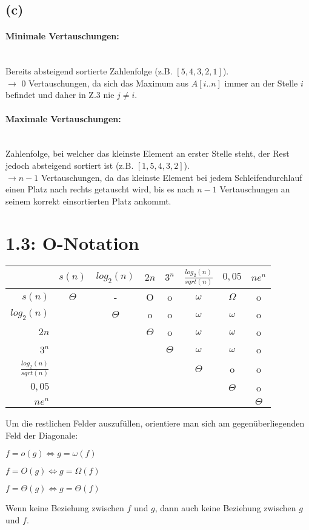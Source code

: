 \documentclass[a4paper,12pt]{article}
\begin{document}
\subsection{(c)}
\paragraph{Minimale Vertauschungen:}\mbox{}\\
\indent Bereits absteigend sortierte Zahlenfolge (z.B. $[5,4,3,2,1]$). \\
$\rightarrow$ 0 Vertauschungen, da sich das Maximum aus $A[i..n]$ immer an der Stelle $i$ befindet und daher in Z.3 nie $j \neq i$.

\paragraph{Maximale Vertauschungen:}\mbox{}\\
\indent Zahlenfolge, bei welcher das kleinste Element an erster Stelle steht, der Rest jedoch absteigend sortiert ist (z.B. $[1,5,4,3,2]$). \\
$\rightarrow n-1$ Vertauschungen, da das kleinste Element bei jedem Schleifendurchlauf einen Platz nach rechts getauscht wird, bis es nach $n-1$ Vertauschungen an seinem korrekt einsortierten Platz ankommt.

\section{1.3: O-Notation}

\begin{center}
\begin{tabular}{| r | c | c | c | c | c | c | c |}
\hline
& $s(n)$ & $log_2(n)$ & $2n$ & $3^n$ & $\frac{log_2(n)}{sqrt(n)}$ & $0,05$ & $ne^n$ \\ \hline
$s(n)$ & $\Theta$ & - & O & o & $\omega$ & $\Omega$ & o \\ \hline
$log_2(n)$ & & $\Theta$ & o & o & $\omega$ & $\omega$ & o \\ \hline
$2n$ & & & $\Theta$ & o & $\omega$ & $\omega$ & o \\ \hline
$3^n$ & & & & $\Theta$ & $\omega$ & $\omega$ & o \\ \hline
$\frac{log_2(n)}{sqrt(n)}$ & & & & & $\Theta$ & o & o \\ \hline
$0,05$ & & & & & & $\Theta$ & o \\ \hline
$ne^n$ & & & & & & & $\Theta$ \\ \hline
\end{tabular}
\end{center}
Um die restlichen Felder auszufüllen, orientiere man sich am gegenüberliegenden Feld der Diagonale: 
\begin{description}
	\item $f=o(g) \iff g=\omega(f)$
	\item $f=O(g) \iff g=\Omega(f)$
	\item $f=\Theta(g) \iff g=\Theta(f)$
	\item Wenn keine Beziehung zwischen $f$ und $g$, dann auch keine Beziehung zwischen $g$ und $f$.
\end{description}
\end{document}
